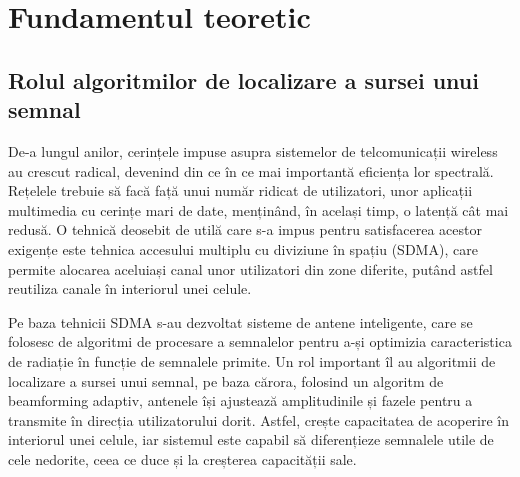 \chapter{Fundamentul teoretic}
\label{chapter:background}

\section{Rolul algoritmilor de localizare a sursei unui semnal}
\label{sec:role-doa}
De-a lungul anilor, cerințele impuse asupra sistemelor de telcomunicații
wireless au crescut radical, devenind din ce în ce mai importantă eficiența lor
spectrală. Rețelele trebuie să facă față unui număr ridicat de utilizatori, unor
aplicații multimedia cu cerințe mari de date, menținând, în același timp, o
latență cât mai redusă. O tehnică deosebit de utilă care s-a impus pentru
satisfacerea acestor exigențe este tehnica accesului multiplu cu diviziune în
spațiu (SDMA), care permite alocarea aceluiași canal unor utilizatori din zone
diferite, putând astfel reutiliza canale în interiorul unei celule. \\

Pe baza tehnicii SDMA s-au dezvoltat sisteme de antene inteligente, care se
folosesc de algoritmi de procesare a semnalelor pentru a-și optimizia
caracteristica de radiație în funcție de semnalele primite. Un rol important îl
au algoritmii de localizare a sursei unui semnal, pe baza cărora, folosind un
algoritm de beamforming adaptiv, antenele își ajustează amplitudinile și fazele
pentru a transmite în direcția utilizatorului dorit. Astfel, crește capacitatea
de acoperire în interiorul unei celule, iar sistemul este capabil să diferențieze
semnalele utile de cele nedorite, ceea ce duce și la creșterea capacității
sale.

% 
% 

